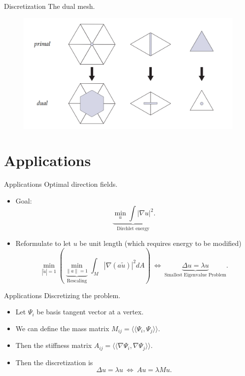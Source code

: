 \documentclass[UKenglish]{beamer}
\begin{document}
\begin{frame}{Discretization}
    The dual mesh.
    \begin{figure}
        \centering
        \includegraphics[width=\textwidth]{Figures/dual_mesh.png}
    \end{figure}
\end{frame}

\section{Applications}

\begin{frame}{Applications}
    Optimal direction fields.
    \begin{itemize}
        \item Goal:
        \[
        \underbrace{\min_u \int |\nabla u|^2}_{\textrm{Dirchlet energy}}.
        \]
        \item Reformulate to let $u$ be unit length (which requires energy to be modified)
        \[
        \min_{|\tilde{u}|=1}\left(\underbrace{\min_{\|a\|=1}}_{\textrm{Rescaling}}\int_M |\nabla (a \tilde{u})|^2dA\right) ~\iff~ \underbrace{\Delta u = \lambda u}_{\textrm{Smallest Eigenvalue Problem}}.
        \]
    \end{itemize}
\end{frame}

\begin{frame}{Applications}
    Discretizing the problem.
    \begin{itemize}
        \item Let $\Psi_i$ be basis tangent vector at a vertex.
        \item We can define the mass matrix $M_{ij}=\langle\langle \Psi_i,\Psi_j\rangle\rangle$.
        \item Then the stiffness matrix $A_{ij}=\langle\langle \nabla \Psi_i, \nabla \Psi_j\rangle \rangle$.
        \item Then the discretization is
        \[
        \Delta u = \lambda u ~\iff~ Au=\lambda Mu.
        \]
    \end{itemize}
\end{frame}
\end{document}
